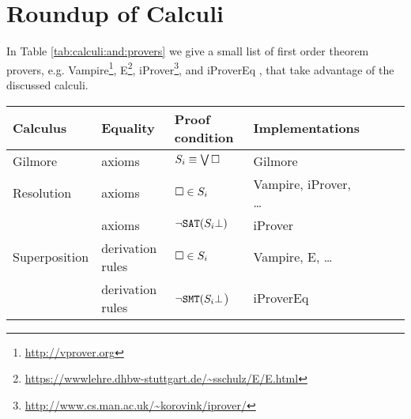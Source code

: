 \newpage

\section{Roundup of Calculi}

In Table \vref{tab:calculi:and:provers} we give a small list of first order theorem provers,
e.g. 
Vampire\footnote{\url{http://vprover.org}}, 
E\footnote{\url{https://wwwlehre.dhbw-stuttgart.de/~sschulz/E/E.html}},
iProver\footnote{\url{http://www.cs.man.ac.uk/~korovink/iprover/}},
and iProverEq \cite{KS2010ijcar},
that take advantage of the discussed calculi.

\begin{table}[hb]
\begin{tabular}{lllllll}
	\toprule
	Calculus & Equality & Proof condition & Implementations
	\\ \midrule
	Gilmore & axioms & \( S_i \equiv \bigvee\square \) & Gilmore
	\\
	Resolution & axioms & \( \square\in S_i \) & Vampire, iProver, \ldots
	\\
	\InstGen{} & axioms & \( \lnot\texttt{SAT}(S_i\bot) \) 
	& iProver
	\\
	Superposition & derivation rules & \( \square\in S_i \) 
	& Vampire, E, \ldots
	\\
	\InstGenEQ{} & derivation rules & \( \lnot\texttt{SMT}(S_i\bot \)) 
	& iProverEq
	\\ \bottomrule
\end{tabular}
\label{tab:calculi:and:provers}
\end{table}





